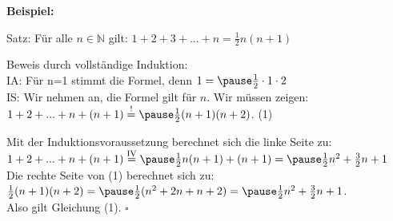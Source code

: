 \begin{frame}[fragile]

\textbf{Beispiel:}

Satz: Für alle $n \in \mathbb{N}$ gilt: $1+2+3+...+n = \frac{1}{2}n(n+1)$

Beweis durch vollständige Induktion: \\
IA: \pause Für n=1 stimmt die Formel, denn \pause $1 = \pause \frac{1}{2}\cdot 1 \cdot 2$ \\ \pause
IS: \pause Wir nehmen an, die Formel gilt für $n$. Wir müssen zeigen: \pause \\
$1 + 2 + ... + n + (n+1)  \overset{!}{=} \pause \frac{1}{2}(n+1)(n+2)$.  \quad \quad (1) \\ \pause

Mit der Induktionsvoraussetzung berechnet sich die linke Seite zu: \\
$1 + 2 + ... + n + (n+1)  \overset{\text{IV}}{=}  \pause \frac{1}{2}n(n+1) + (n+1) = \pause \frac{1}{2}n^2 + \frac{3}{2}n +1$ \\ \pause
Die rechte Seite von (1) berechnet sich zu: \\
 $\frac{1}{2}(n+1)(n+2) = \pause \frac{1}{2}(n^2+2n+n+2) = \pause \frac{1}{2}n^2+ \frac{3}{2}n+1$. \\ \pause
Also gilt Gleichung (1).  \hfill $\square$


\end{frame}




